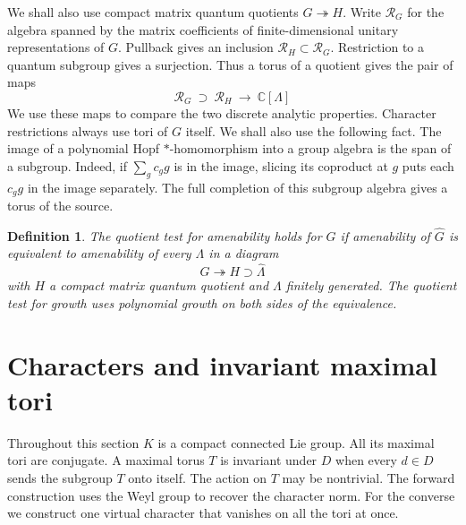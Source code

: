 \documentclass[11pt,a4paper]{article}
\newtheorem{defn}[thm]{Definition}
\theoremstyle{remark}
\begin{document}
We shall also use compact matrix quantum quotients $G\twoheadrightarrow H$.
Write $\mathcal R_G$ for the algebra spanned by the matrix coefficients
of finite-dimensional unitary representations of $G$. Pullback gives an
inclusion $\mathcal R_H\subset\mathcal R_G$.
Restriction to a quantum subgroup gives a surjection. Thus a torus of a quotient gives
the pair of maps
\[
 \mathcal R_G\ \supset\ \mathcal R_H\
                    \longrightarrow\ \mathbb C[\Lambda]
\]
We use these maps to compare the two discrete analytic properties.
Character restrictions always use tori of $G$ itself. We shall also use
the following fact. The image of a polynomial Hopf $*$-homomorphism
into a group algebra is the span of a subgroup. Indeed, if $\sum_g c_g g$ is in the image, slicing
its coproduct at $g$ puts each $c_g g$ in the image separately. The
full completion of this subgroup algebra gives a torus of the source.

\begin{defn}\label{quotients}
The quotient test for amenability holds for $G$ if amenability of
$\widehat G$ is equivalent to amenability of every $\Lambda$ in a diagram
\[
 G\twoheadrightarrow H\supset\widehat\Lambda
\]
with $H$ a compact matrix quantum quotient and $\Lambda$ finitely
generated. The quotient test for growth uses polynomial growth on both
sides of the equivalence.
\end{defn}

\section{Characters and invariant maximal tori}\label{secweyl}

Throughout this section $K$ is a compact connected Lie group.
All its maximal tori are conjugate. A maximal torus $T$ is invariant
under $D$ when every $d\in D$ sends the subgroup $T$ onto itself.
The action on $T$ may be nontrivial. The forward construction uses
the Weyl group to recover the character norm. For the converse we
construct one virtual character that vanishes on all the tori at once.
\end{document}
